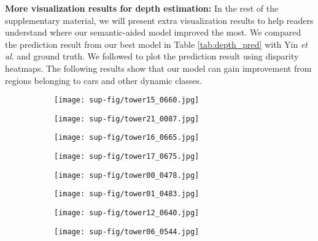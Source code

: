 \documentclass[10pt,twocolumn]{article}
\begin{document}
\noindent\textbf{More visualization results for depth estimation:} In the rest of the supplementary material, we will present extra visualization results to help readers understand where our semantic-aided model improved the most. We compared the prediction result from our best model in Table \ref{tab:depth_pred} with Yin \textit{et al}. \cite{yin2018geonet} and ground truth. We followed \cite{Garg2016UnsupervisedCF} to plot the prediction result using disparity heatmaps. The following results show that our model can gain improvement from regions belonging to cars and other dynamic classes.

\newpage
\begin{figure}[!hbtp]
    \centering
         \begin{subfigure}[b]{0.48\linewidth}
      \texttt{[image: sup-fig/tower15\_0660.jpg]}
     \end{subfigure}
     \GAP
     \begin{subfigure}[b]{0.48\linewidth}
      \texttt{[image: sup-fig/tower21\_0087.jpg]}
     \end{subfigure}
    \caption{\CAPOUR}
\end{figure}

\begin{figure}[!hbtp]
    \centering
         \begin{subfigure}[b]{0.48\linewidth}
      \texttt{[image: sup-fig/tower16\_0665.jpg]}
     \end{subfigure}
     \GAP
     \begin{subfigure}[b]{0.48\linewidth}
      \texttt{[image: sup-fig/tower17\_0675.jpg]}
     \end{subfigure}
    \caption{\CAPOUR}
\end{figure}

\begin{figure}[!hbtp]
    \centering
         \begin{subfigure}[b]{0.48\linewidth}
      \texttt{[image: sup-fig/tower00\_0478.jpg]}
     \end{subfigure}
     \GAP
     \begin{subfigure}[b]{0.48\linewidth}
      \texttt{[image: sup-fig/tower01\_0483.jpg]}
     \end{subfigure}
    \caption{\CAPOUR}
\end{figure}

\begin{figure}[!hbtp]
    \centering
         \begin{subfigure}[b]{0.48\linewidth}
      \texttt{[image: sup-fig/tower12\_0640.jpg]}
     \end{subfigure}
     \GAP
     \begin{subfigure}[b]{0.48\linewidth}
      \texttt{[image: sup-fig/tower06\_0544.jpg]}
     \end{subfigure}
    \caption{\CAPOUR}
\end{figure}
\end{document}
